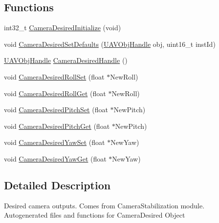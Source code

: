 \subsection*{\-Functions}
\begin{DoxyCompactItemize}
\item 
int32\-\_\-t \hyperlink{group___camera_desired_ga91665eb4e00587ad735aa2debaaae3a2}{\-Camera\-Desired\-Initialize} (void)
\item 
void \hyperlink{group___camera_desired_ga71b08947690259e7f2f7acd598b48221}{\-Camera\-Desired\-Set\-Defaults} (\hyperlink{targets_2_u_a_v_objects_2inc_2uavobjectmanager_8h_a279053e22be53ce9f895043aaeb91e3b}{\-U\-A\-V\-Obj\-Handle} obj, uint16\-\_\-t inst\-Id)
\item 
\hyperlink{targets_2_u_a_v_objects_2inc_2uavobjectmanager_8h_a279053e22be53ce9f895043aaeb91e3b}{\-U\-A\-V\-Obj\-Handle} \hyperlink{group___camera_desired_ga9f3a34e1d91539a09fcb479c457f562d}{\-Camera\-Desired\-Handle} ()
\item 
void \hyperlink{group___camera_desired_ga76e5cc3ee3366b7ffd393b51236b9420}{\-Camera\-Desired\-Roll\-Set} (float $\ast$\-New\-Roll)
\item 
void \hyperlink{group___camera_desired_ga348e63cff0242512019123cb175a596a}{\-Camera\-Desired\-Roll\-Get} (float $\ast$\-New\-Roll)
\item 
void \hyperlink{group___camera_desired_ga2143ef5accc88c84970a12b461a58438}{\-Camera\-Desired\-Pitch\-Set} (float $\ast$\-New\-Pitch)
\item 
void \hyperlink{group___camera_desired_ga3471dc0284a6c3470e9b88e0f19e558d}{\-Camera\-Desired\-Pitch\-Get} (float $\ast$\-New\-Pitch)
\item 
void \hyperlink{group___camera_desired_gad8715dc7846a26f2bebbaaaafbcba2c9}{\-Camera\-Desired\-Yaw\-Set} (float $\ast$\-New\-Yaw)
\item 
void \hyperlink{group___camera_desired_ga831f0df4349bcce9fdd8bc2c266fd43a}{\-Camera\-Desired\-Yaw\-Get} (float $\ast$\-New\-Yaw)
\end{DoxyCompactItemize}


\subsection{\-Detailed \-Description}
\-Desired camera outputs. \-Comes from \-Camera\-Stabilization module. \-Autogenerated files and functions for \-Camera\-Desired \-Object 

